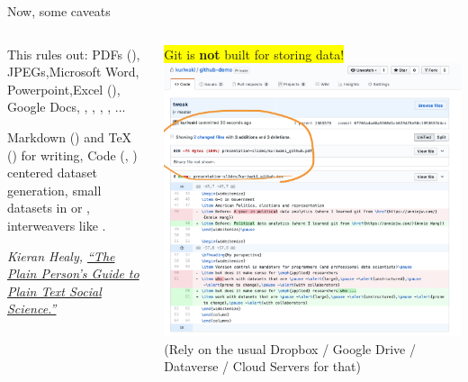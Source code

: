 \documentclass[ignorenonframetext,notes, 10pt, aspectratio=169]{beamer}
\begin{document}
\begin{frame}{Now, some caveats}
\begin{columns}[T]
\begin{column}{0.5\textwidth}

  This rules out:
   {\small \pause PDFs (), \pause JPEGs,\pause Microsoft Word, \pause Powerpoint,\pause Excel (), \pause Google Docs, \pause {}, , , , ...}
\pause
  \pause

 {\small Markdown () and TeX () for writing,  \pause Code (, ) centered dataset generation, small datasets in  or , \pause interweavers  like .} \pause

\bigskip
 {\footnotesize \emph{Kieran Healy, \href{https://kieranhealy.org/publications/plain-person-text/}{``The Plain Person’s Guide to Plain Text Social Science.''}}}

\end{column}
\begin{column}{0.5\textwidth}
  \colorbox{yellow}{Git is {\textbf{not}} built for storing data!}\\
\centering
{\includegraphics[width = 0.9\linewidth]{pdf-notrack.png}}
\flushleft
  (Rely on the usual Dropbox / Google Drive / Dataverse / Cloud Servers for that)
\end{column}
\end{columns}
\end{frame}
\end{document}

